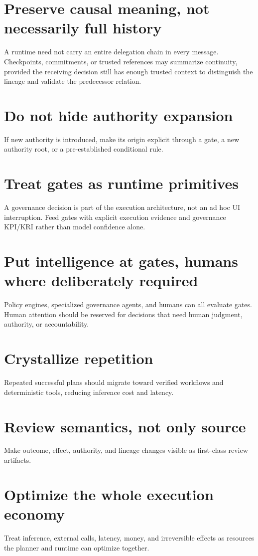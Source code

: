 \documentclass[10pt,oneside,openany]{book}
\begin{document}
\section{Preserve causal meaning, not necessarily full history}
A runtime need not carry an entire delegation chain in every message. Checkpoints, commitments, or trusted references may summarize continuity, provided the receiving decision still has enough trusted context to distinguish the lineage and validate the predecessor relation.

\section{Do not hide authority expansion}
If new authority is introduced, make its origin explicit through a gate, a new authority root, or a pre-established conditional rule.

\section{Treat gates as runtime primitives}
A governance decision is part of the execution architecture, not an ad hoc UI interruption. Feed gates with explicit execution evidence and governance KPI/KRI rather than model confidence alone.

\section{Put intelligence at gates, humans where deliberately required}
Policy engines, specialized governance agents, and humans can all evaluate gates. Human attention should be reserved for decisions that need human judgment, authority, or accountability.

\section{Crystallize repetition}
Repeated successful plans should migrate toward verified workflows and deterministic tools, reducing inference cost and latency.

\section{Review semantics, not only source}
Make outcome, effect, authority, and lineage changes visible as first-class review artifacts.

\section{Optimize the whole execution economy}
Treat inference, external calls, latency, money, and irreversible effects as resources the planner and runtime can optimize together.
\end{document}
